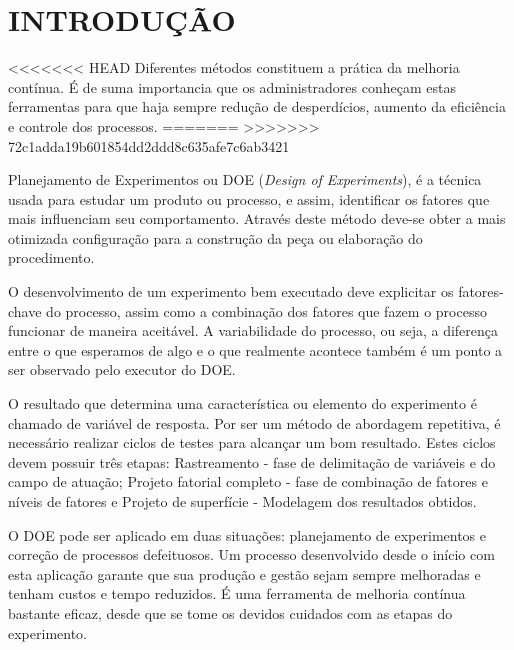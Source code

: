 \chapter{INTRODUÇÃO}
<<<<<<< HEAD
    Diferentes métodos constituem a prática da melhoria contínua. É de suma importancia que os administradores conheçam estas ferramentas para que haja sempre redução de desperdícios, aumento da eficiência e controle dos processos.
=======
\label{chap:introducao}
>>>>>>> 72c1adda19b601854dd2ddd8c635afe7c6ab3421

    Planejamento de Experimentos ou DOE (\textit{Design of Experiments}), é a técnica usada para estudar um produto ou processo, e assim, identificar os fatores que mais influenciam seu comportamento. Através deste método deve-se obter a mais otimizada configuração para a construção da peça ou elaboração do procedimento.

    O desenvolvimento de um experimento bem executado deve explicitar os fatores-chave do processo, assim como a combinação dos fatores que fazem o processo funcionar de maneira aceitável. A variabilidade do processo, ou seja, a diferença entre o que esperamos de algo e o que realmente acontece também é um ponto a ser observado pelo executor do DOE.

    O resultado que determina uma característica ou elemento do experimento é chamado de variável de resposta. Por ser um método de abordagem repetitiva, é necessário realizar ciclos de testes para alcançar um bom resultado. Estes ciclos devem possuir três etapas: Rastreamento - fase de delimitação de variáveis e do campo de atuação; Projeto fatorial completo - fase de combinação de fatores e níveis de fatores e Projeto de superfície - Modelagem dos resultados obtidos.   

    O DOE pode ser aplicado em duas situações: planejamento de experimentos e correção de processos defeituosos. Um processo desenvolvido desde o início com esta aplicação garante que sua produção e gestão sejam sempre melhoradas e tenham custos e tempo reduzidos. É uma ferramenta de melhoria contínua bastante eficaz, desde que se tome os devidos cuidados com as etapas do experimento.


    
    
    


